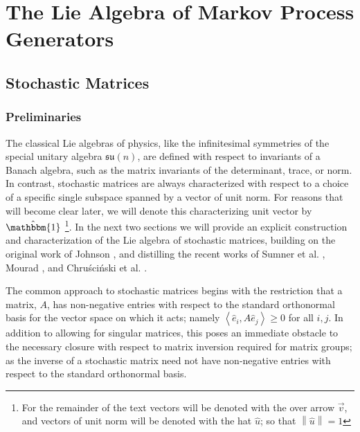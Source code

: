 \chapter{The Lie Algebra of Markov Process Generators}
\section{Stochastic Matrices}
\subsection{Preliminaries}
The classical Lie algebras of physics, like the infinitesimal symmetries of the special
unitary algebra $\mathfrak{su}(n)$, are defined with respect to invariants of a Banach
algebra, such as the matrix invariants of the determinant, trace, or norm. In contrast,
stochastic matrices are always characterized with respect to a choice of a specific single
subspace spanned by a vector of unit norm. For reasons that will become clear later, we will
denote this characterizing unit vector by $\hat{\mathbbm{1}}$
\footnote{For the remainder of the text vectors will be denoted with the over arrow $\vec{v}$, and vectors of unit norm will be denoted with the hat $\hat{u}$; so that $\left\| \hat{u} \right\| = 1$}. In the next two sections we 
will provide an explicit construction and characterization of the Lie algebra of stochastic 
matrices, building on the original work of Johnson \cite{johnson_markov-type_1985}, and
distilling the recent works of Sumner et al. \cite{sumner_lie_2012,fernandez-sanchez_lie_2012}, 
Mourad \cite{mourad_lie-theoretic_2004}, and Chruściński et al. \cite{chruscinski_pseudo-stochastic_2015}.

The common approach to stochastic matrices begins with the restriction that a matrix, $A$,
has non-negative entries with respect to the standard orthonormal basis for the vector
space on which it acts; namely $\left\langle\hat{e}_i,A \hat{e}_j\right\rangle \ge 0$ for 
all $i,j$. In addition to allowing for singular matrices, this poses an immediate obstacle
to the necessary closure with respect to matrix inversion required for matrix groups; as the
inverse of a stochastic matrix need not have non-negative entries with respect to the
standard orthonormal basis. 

